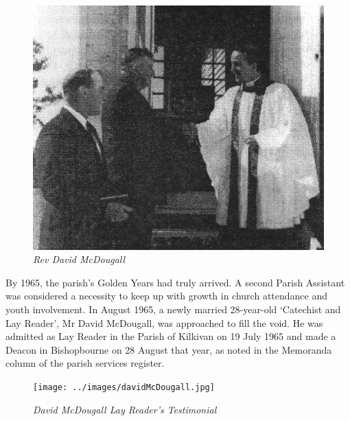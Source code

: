 \begin{figure}
\begin{center}
\includegraphics[width=1.\linewidth,center]{../images/DMcDougall.jpg}
\caption{\itshape Rev David McDougall}
\end{center}
\end{figure}




By 1965, the parish's Golden Years had truly arrived. A second Parish Assistant was considered a necessity to keep up with growth in church attendance and youth involvement. In August 1965, a newly married 28-year-old `Catechist and Lay Reader', Mr David McDougall, was approached to fill the void. He was admitted as Lay Reader in the Parish of Kilkivan on 19 July 1965 and made a Deacon in Bishopbourne on 28 August that year, as noted in the Memoranda column of the parish services register.









\begin{figure}[!htb]
\begin{center}
\texttt{[image: ../images/davidMcDougall.jpg]}
\caption{\itshape David McDougall Lay Reader's Testimonial}
\end{center}
\end{figure}




